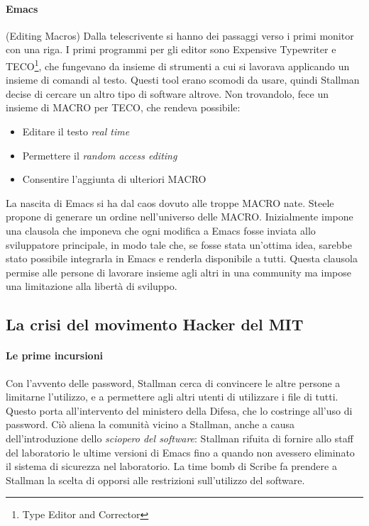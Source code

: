 \paragraph*{Emacs} (Editing Macros) Dalla telescrivente si hanno dei passaggi verso i primi monitor con una riga. I primi programmi per gli editor sono Expensive Typewriter e TECO\footnote{Type Editor and Corrector}, che fungevano da insieme di strumenti a cui si lavorava applicando un insieme di comandi al testo. Questi tool erano scomodi da usare, quindi Stallman decise di cercare un altro tipo di software altrove. Non trovandolo, fece un insieme di MACRO per TECO, che rendeva possibile:
\begin{itemize}
  
\item Editare il testo \textit{real time}
\item Permettere il \textit{random access editing}
\item Consentire l'aggiunta di ulteriori MACRO

\end{itemize}

La nascita di Emacs si ha dal caos dovuto alle troppe MACRO nate. Steele propone di generare un ordine nell'universo delle MACRO. Inizialmente impone una clausola che imponeva che ogni modifica a Emacs fosse inviata allo sviluppatore principale, in modo tale che, se fosse stata un'ottima idea, sarebbe stato possibile integrarla in Emacs e renderla disponibile a tutti. Questa clausola permise alle persone di lavorare insieme agli altri in una community ma impose una limitazione alla libert\`a di sviluppo.

\subsection{La crisi del movimento Hacker del MIT}

\paragraph*{Le prime incursioni} Con l'avvento delle password, Stallman cerca di convincere le altre persone a limitarne l'utilizzo, e a permettere agli altri utenti di utilizzare i file di tutti. Questo porta all'intervento del ministero della Difesa, che lo costringe all'uso di password. Ci\`o aliena la comunit\`a vicino a Stallman, anche a causa dell'introduzione dello \textit{sciopero del software}:
Stallman rifuita di fornire allo staff del laboratorio le ultime versioni di Emacs fino a quando non avessero eliminato il sistema di sicurezza nel laboratorio. La time bomb di Scribe fa prendere a Stallman la scelta di opporsi alle restrizioni sull'utilizzo del software.

